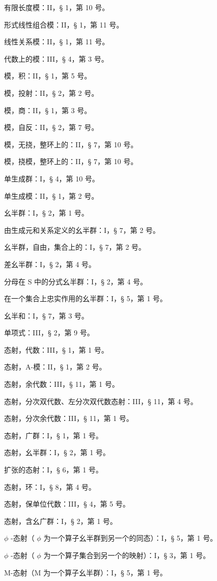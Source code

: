 有限长度模：II，§ 1，第 10 号。

形式线性组合模：II，§ 1，第 11 号。

线性关系模：II，§ 1，第 11 号。

代数上的模：III，§ 4，第 3 号。

模，积：II，§ 1，第 5 号。

模，投射：II，§ 2，第 2 号。

模，商：II，§ 1，第 3 号。

模，自反：II，§ 2，第 7 号。

模，无挠，整环上的：II，§ 7，第 10 号。

模，挠模，整环上的：II，§ 7，第 10 号。

单生成群：I，§ 4，第 10 号。

单生成模：II，§ 1，第 2 号。

幺半群：I，§ 2，第 1 号。

由生成元和关系定义的幺半群：I，§ 7，第 2 号。

幺半群，自由，集合上的：I，§ 7，第 2 号。

差幺半群：I，§ 2，第 4 号。

分母在 S 中的分式幺半群：I，§ 2，第 4 号。

在一个集合上忠实作用的幺半群：I，§ 5，第 1 号。

幺半和：I，§ 7，第 3 号。

单项式：III，§ 2，第 9 号。

态射，代数：III，§ 1，第 1 号。

态射，A-模：II，§ 1，第 2 号。

态射，余代数：III，§ 11，第 1 号。

态射，分次双代数、左分次双代数态射：III，§ 11，第 4 号。

态射，分次余代数：III，§ 11，第 1 号。

态射，广群：I，§ 1，第 1 号。

态射，幺半群：I，§ 2，第 1 号。

扩张的态射：I，§ 6，第 1 号。

态射，环：I，§ 8，第 4 号。

态射，保单位代数：III，§ 4，第 5 号。

态射，含幺广群：I，§ 2，第 1 号。

\(\phi\) -态射（ \(\phi\) 为一个算子幺半群到另一个的同态）：I，§ 5，第 1 号。

\(\phi\) -态射（ \(\phi\) 为一个算子集合到另一个的映射）：I，§ 3，第 1 号。

M-态射（M 为一个算子幺半群）：I，§ 5，第 1 号。

